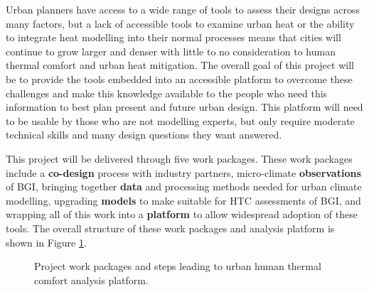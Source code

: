 Urban planners have access to a wide range of tools to assess their designs across many factors, but a lack of accessible tools to examine urban heat or the ability to integrate heat modelling into their normal processes means that cities will continue to grow larger and denser with little to no consideration to human thermal comfort and urban heat mitigation. The overall goal of this project will be to provide the tools embedded into an accessible platform to overcome these challenges and make this knowledge available to the people who need this information to best plan present and future urban design. This platform will need to be usable by those who are not modelling experts, but only require moderate technical skills and many design questions they want answered. 

This project will be delivered through five work packages. These work packages include a \textbf{co-design} process with industry partners, micro-climate \textbf{observations} of BGI, bringing together \textbf{data} and processing methods needed for urban climate modelling, upgrading \textbf{models} to make suitable for HTC assessments of BGI, and wrapping all of this work into a \textbf{platform} to allow widespread adoption of these tools. The overall structure of these work packages and analysis platform is shown in Figure \ref{fig:overall}.

\begin{figure}[ht]
\begin{center}
\end{center}
\caption{Project work packages and steps leading to urban human thermal comfort analysis platform.}
\label{fig:overall}
\end{figure}

